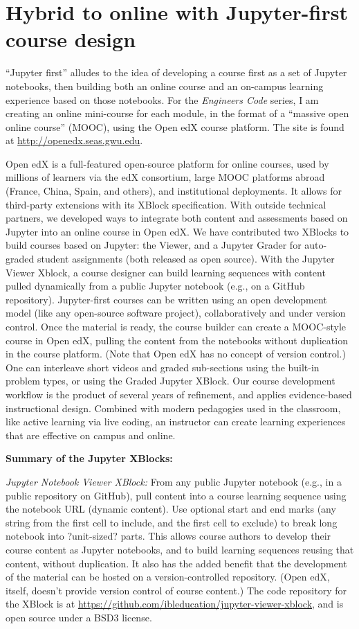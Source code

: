 \documentclass[10pt,journal,compsoc]{IEEEtran}
\begin{document}
\section{Hybrid to online with Jupyter-first course design}

``Jupyter first'' alludes to the idea of developing a course first as a set of Jupyter notebooks, then building both an online course and an on-campus learning experience based on those notebooks. 
For the \emph{Engineers Code} series, I am creating an online mini-course for each module,  in the format of a ``massive open online course'' (MOOC), using the Open edX course platform. 
The site is found at \url{http://openedx.seas.gwu.edu}. 

Open edX is a full-featured open-source platform for online courses, used by millions of learners via the edX consortium, large MOOC platforms abroad (France, China, Spain, and others), and institutional deployments. 
It allows for third-party extensions with its XBlock specification. 
With outside technical partners, we developed ways to integrate both content and assessments based on Jupyter into an online course in Open edX. 
We have contributed two XBlocks to build courses based on Jupyter: the Viewer, and a Jupyter Grader for auto-graded student assignments (both released as open source). 
With the Jupyter Viewer Xblock, a course designer can build learning sequences with content pulled dynamically from a public Jupyter notebook (e.g., on a GitHub repository). 
Jupyter-first courses can be written using an open development model (like any open-source software project), collaboratively and under version control. 
Once the material is ready, the course builder can create a MOOC-style course in Open edX, pulling the content from the notebooks without duplication in the course platform. 
(Note that Open edX has no concept of version control.) 
One can interleave short videos and graded sub-sections using the built-in problem types, or using the Graded Jupyter XBlock. 
Our course development workflow is the product of several years of refinement, and applies evidence-based instructional design. 
Combined with modern pedagogies used in the classroom, like active learning via live coding, an instructor can create learning experiences that are effective on campus and online. 

\textbf{Summary of the Jupyter XBlocks:}

\emph{Jupyter Notebook Viewer XBlock:} From any public Jupyter notebook (e.g., in a public repository on GitHub), pull content into a course learning sequence using the notebook URL (dynamic content). 
Use optional start and end marks (any string from the first cell to include, and the first cell to exclude) to break long notebook into ?unit-sized? parts. 
This allows course authors to develop their course content as Jupyter notebooks, and to build learning sequences reusing that content, without duplication. 
It also has the added benefit that the development of the material can be hosted on a version-controlled repository. (Open edX, itself, doesn't provide version control of course content.)
The code repository for the XBlock is at \url{https://github.com/ibleducation/jupyter-viewer-xblock}, and is open source under a BSD3 license.
\end{document}
